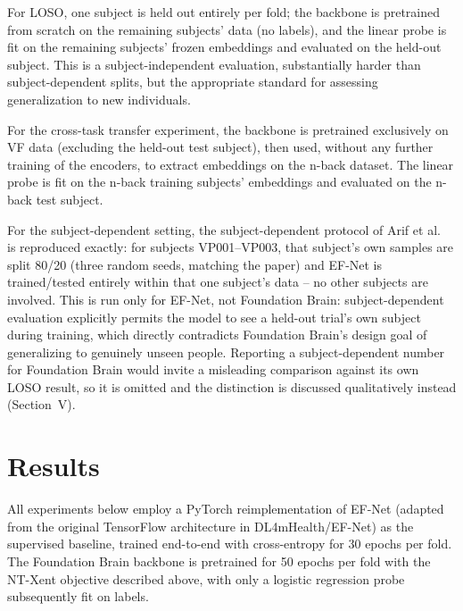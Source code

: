 \documentclass[journal]{IEEEtran}
\begin{document}
For LOSO, one subject is held out entirely per fold; the backbone is pretrained from scratch on the remaining subjects' data (no labels), and the linear probe is fit on the remaining subjects' frozen embeddings and evaluated on the held-out subject. This is a subject-independent evaluation, substantially harder than subject-dependent splits, but the appropriate standard for assessing generalization to new individuals.

For the cross-task transfer experiment, the backbone is pretrained exclusively on VF data (excluding the held-out test subject), then used, without any further training of the encoders, to extract embeddings on the n-back dataset. The linear probe is fit on the n-back training subjects' embeddings and evaluated on the n-back test subject.

For the subject-dependent setting, the subject-dependent protocol of Arif et al.~\cite{arif2024} is reproduced exactly: for subjects VP001--VP003, that subject's own samples are split 80/20 (three random seeds, matching the paper) and EF-Net is trained/tested entirely within that one subject's data -- no other subjects are involved. This is run only for EF-Net, not Foundation Brain: subject-dependent evaluation explicitly permits the model to see a held-out trial's own subject during training, which directly contradicts Foundation Brain's design goal of generalizing to genuinely unseen people. Reporting a subject-dependent number for Foundation Brain would invite a misleading comparison against its own LOSO result, so it is omitted and the distinction is discussed qualitatively instead (Section~V).

\section{Results}
All experiments below employ a PyTorch reimplementation of EF-Net (adapted from the original TensorFlow architecture in DL4mHealth/EF-Net) as the supervised baseline, trained end-to-end with cross-entropy for 30 epochs per fold. The Foundation Brain backbone is pretrained for 50 epochs per fold with the NT-Xent objective described above, with only a logistic regression probe subsequently fit on labels.
\end{document}
